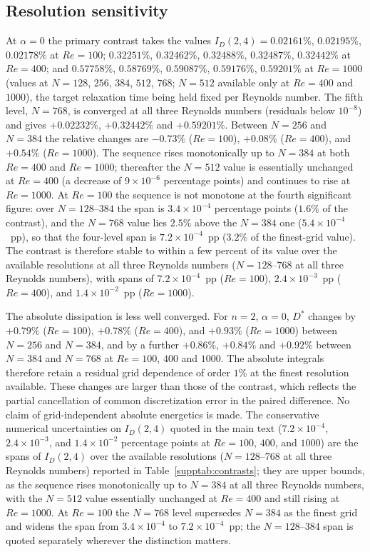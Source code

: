 \subsection{Resolution sensitivity}

At $\alpha=0$ the primary contrast takes the values $I_D(2,4)=0.02161\%$, $0.02195\%$, $0.02178\%$ at $Re=100$; $0.32251\%$, $0.32462\%$, $0.32488\%$, $0.32487\%$, $0.32442\%$ at $Re=400$; and $0.57758\%$, $0.58769\%$, $0.59087\%$, $0.59176\%$, $0.59201\%$ at $Re=1000$ (values at $N=128$, $256$, $384$, $512$, $768$; $N=512$ available only at $Re=400$ and $1000$), the target relaxation time being held fixed per Reynolds number. The fifth level, $N=768$, is converged at all three Reynolds numbers (residuals below $10^{-8}$) and gives $+0.02232\%$, $+0.32442\%$ and $+0.59201\%$. Between $N=256$ and $N=384$ the relative changes are $-0.73\%$ ($Re=100$), $+0.08\%$ ($Re=400$), and $+0.54\%$ ($Re=1000$). The sequence rises monotonically up to $N=384$ at both $Re=400$ and $Re=1000$; thereafter the $N=512$ value is essentially unchanged at $Re=400$ (a decrease of $9\times10^{-6}$ percentage points) and continues to rise at $Re=1000$. At $Re=100$ the sequence is not monotone at the fourth significant figure: over $N=128$--$384$ the span is $3.4\times10^{-4}$ percentage points ($1.6\%$ of the contrast), and the $N=768$ value lies $2.5\%$ above the $N=384$ one ($5.4\times10^{-4}$~pp), so that the four-level span is $7.2\times10^{-4}$~pp ($3.2\%$ of the finest-grid value). The contrast is therefore stable to within a few percent of its value over the available resolutions at all three Reynolds numbers ($N=128$--$768$ at all three Reynolds numbers), with spans of $7.2\times10^{-4}$~pp ($Re=100$), $2.4\times10^{-3}$~pp ($Re=400$), and $1.4\times10^{-2}$~pp ($Re=1000$).

The absolute dissipation is less well converged. For $n=2$, $\alpha=0$, $D^*$ changes by $+0.79\%$ ($Re=100$), $+0.78\%$ ($Re=400$), and $+0.93\%$ ($Re=1000$) between $N=256$ and $N=384$, and by a further $+0.86\%$, $+0.84\%$ and $+0.92\%$ between $N=384$ and $N=768$ at $Re=100$, $400$ and $1000$. The absolute integrals therefore retain a residual grid dependence of order $1\%$ at the finest resolution available. These changes are larger than those of the contrast, which reflects the partial cancellation of common discretization error in the paired difference. No claim of grid-independent absolute energetics is made. The conservative numerical uncertainties on $I_D(2,4)$ quoted in the main text ($7.2\times10^{-4}$, $2.4\times10^{-3}$, and $1.4\times10^{-2}$ percentage points at $Re = 100$, $400$, and $1000$) are the spans of $I_D(2,4)$ over the available resolutions ($N = 128$--$768$ at all three Reynolds numbers) reported in Table~\ref{supptab:contrasts}; they are upper bounds, as the sequence rises monotonically up to $N=384$ at all three Reynolds numbers, with the $N=512$ value essentially unchanged at $Re=400$ and still rising at $Re=1000$. At $Re=100$ the $N=768$ level supersedes $N=384$ as the finest grid and widens the span from $3.4\times10^{-4}$ to $7.2\times10^{-4}$~pp; the $N=128$--$384$ span is quoted separately wherever the distinction matters.

